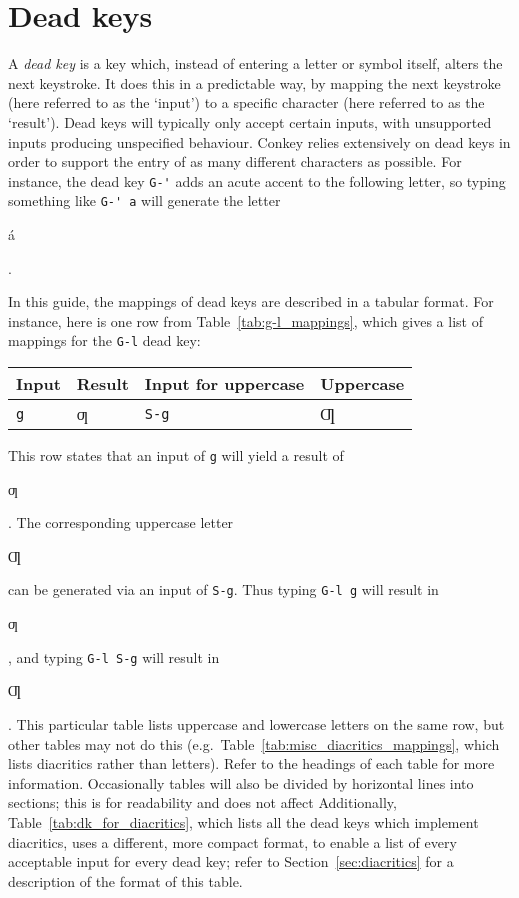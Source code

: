 \documentclass[oneside]{memoir}
\newcommand{\key}{\verb}
\newcommand{\out}[1]{\colorbox{gray!20}{\strut{}#1}}
\begin{document}
\section{Dead keys}
\label{sec:dead_keys}

A \textit{dead key} is a key which, instead of entering a letter or symbol itself, alters the next keystroke.
It does this in a predictable way, by mapping the next keystroke (here referred to as the `input')
  to a specific character (here referred to as the `result').
Dead keys will typically only accept certain inputs,
  with unsupported inputs producing unspecified behaviour\footnotemark.
Conkey relies extensively on dead keys in order to support the entry of as many different characters as possible.
For instance, the dead key \key|G-'| adds an acute accent to the following letter,
  so typing something like \key|G-' a| will generate the letter \out{á}.

In this guide, the mappings of dead keys are described in a tabular format.
For instance, here is one row from Table~\ref{tab:g-l_mappings},
  which gives a list of mappings for the \key|G-l| dead key:

\medskip

\begin{tabular}{llll}
\toprule
Input & Result & Input for uppercase & Uppercase \\
\midrule
\key|g| & ƣ & \key|S-g| & Ƣ \\
\bottomrule
\end{tabular}

\medskip

This row states that an input of \key|g| will yield a result of \out{ƣ}.
The corresponding uppercase letter \out{Ƣ} can be generated via an input of \key|S-g|.
Thus typing \key|G-l g| will result in \out{ƣ},
  and typing \key|G-l S-g| will result in \out{Ƣ}.
This particular table lists uppercase and lowercase letters on the same row,
  but other tables may not do this (e.g.\ Table~\ref{tab:misc_diacritics_mappings}, which lists diacritics rather than letters).
Refer to the headings of each table for more information.
Occasionally tables will also be divided by horizontal lines into sections;
  this is for readability and does not affect 
Additionally, Table~\ref{tab:dk_for_diacritics}, which lists all the dead keys which implement diacritics,
  uses a different, more compact format, to enable a list of every acceptable input for every dead key;
  refer to Section~\ref{sec:diacritics} for a description of the format of this table.
\end{document}
